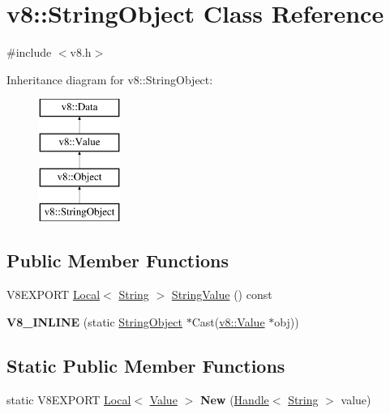 \hypertarget{classv8_1_1_string_object}{}\section{v8\+:\+:String\+Object Class Reference}
\label{classv8_1_1_string_object}


{\ttfamily \#include $<$v8.\+h$>$}

Inheritance diagram for v8\+:\+:String\+Object\+:\begin{figure}[H]
\begin{center}
\leavevmode
\includegraphics[height=4.000000cm]{classv8_1_1_string_object}
\end{center}
\end{figure}
\subsection*{Public Member Functions}
\begin{DoxyCompactItemize}
\item 
V8\+E\+X\+P\+O\+R\+T \hyperlink{classv8_1_1_local}{Local}$<$ \hyperlink{classv8_1_1_string}{String} $>$ \hyperlink{classv8_1_1_string_object_abc51573fc5d4c01266a1ba8c522c6eab}{String\+Value} () const 
\item 
\hypertarget{classv8_1_1_string_object_aeb7ecd92b9fc0c4c5a2e51e166e5d19e}{}{\bfseries V8\+\_\+\+I\+N\+L\+I\+N\+E} (static \hyperlink{classv8_1_1_string_object}{String\+Object} $\ast$Cast(\hyperlink{classv8_1_1_value}{v8\+::\+Value} $\ast$obj))\label{classv8_1_1_string_object_aeb7ecd92b9fc0c4c5a2e51e166e5d19e}

\end{DoxyCompactItemize}
\subsection*{Static Public Member Functions}
\begin{DoxyCompactItemize}
\item 
\hypertarget{classv8_1_1_string_object_a5c97e0af3f2d20cb433c1c286ed83781}{}static V8\+E\+X\+P\+O\+R\+T \hyperlink{classv8_1_1_local}{Local}$<$ \hyperlink{classv8_1_1_value}{Value} $>$ {\bfseries New} (\hyperlink{classv8_1_1_handle}{Handle}$<$ \hyperlink{classv8_1_1_string}{String} $>$ value)\label{classv8_1_1_string_object_a5c97e0af3f2d20cb433c1c286ed83781}

\end{DoxyCompactItemize}


